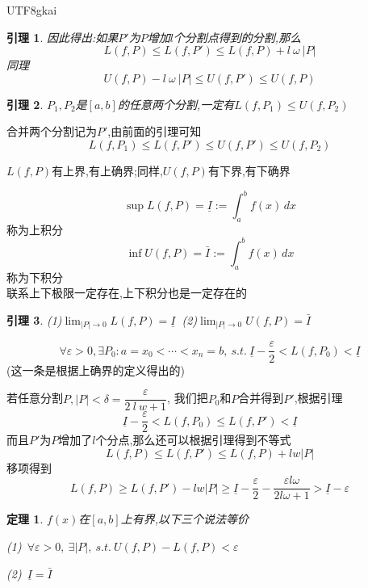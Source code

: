 \documentclass{article}
\newtheorem{theorem}{定理}[subsection]
\newtheorem{lemma}{引理}[subsection]
\newenvironment{cproof}{%
\heiti{证明}\kaishu
}{%
}
\begin{document}
\begin{CJK}{UTF8}{gkai}
\begin{lemma}
  因此得出:如果$P'$为$P$增加$l$个分割点得到的分割,那么\[L(f,P) \leq L(f,P') \leq L(f,P) + l ~\omega~|P|\]
  同理\[U(f,P)  - l~ \omega~|P|\leq U(f,P') \leq U(f,P)\]
\end{lemma}

\begin{lemma}
  $P_1,P_2$是$[a,b]$的任意两个分割,一定有$L(f,P_1)\leq U(f,P_2)$\\
\end{lemma}

\begin{cproof}
  合并两个分割记为$P'$,由前面的引理可知
  \[L(f,P_1)\leq L(f,P') \leq U(f,P')\leq U(f,P_2)\]
\end{cproof}

$L(f,P)$有上界,有上确界;同样,$U(f,P)$有下界,有下确界

\[\sup L(f,P) = \underline{I} := \int_{a}^{b}f(x)\, dx\]称为上积分\\
\[\inf U(f,P) = \bar{I} := \int_{a}^{b}f(x)\, dx\]称为下积分\\
联系上下极限一定存在,上下积分也是一定存在的\\

\begin{lemma}
  (1)$\lim_{|P|\to 0}L(f,P) = \underline{I}~$
  (2)$\lim_{|P|\to 0}U(f,P) = \bar{I}$

\end{lemma}

\begin{cproof}
  \[\forall \varepsilon > 0 ,\exists P_0 : a = x_0 < \cdots < x_n = b, ~s.t.~ \underline{I} - \dfrac{\varepsilon}{2} < L(f 
  ,P_0) < \underline{I}\]
  (这一条是根据上确界的定义得出的)

若任意分割$P,|P| < \delta = \dfrac{\varepsilon}{2~l~w + 1}$,
我们把$P_0$和$P$合并得到$P'$,根据引理
\[\underline{I} - \dfrac{\varepsilon}{2} < L(f,P_0) \leq L(f,P')<  \underline{I}\]
而且$P'$为$P$增加了$l$个分点,那么还可以根据引理得到不等式
\[L(f,P) \leq L(f,P') \leq L(f,P) + lw|P|\]
移项得到\[L(f,P) \geq L(f,P') - l w |P| \geq \underline{I} - \dfrac{\varepsilon}{2} - \dfrac{\varepsilon l \omega}{2 l \omega + 1} > \underline{I} - \varepsilon\]
\end{cproof}

\begin{theorem}
  $f(x)$在$[a,b]$上有界,以下三个说法等价

  (1)~$\forall \varepsilon > 0,~\exists |P|,~s.t.~ U(f,P) - L(f,P) < \varepsilon$

  (2)~$\underline{I} = \bar{I}$


\end{theorem}
\end{CJK}
\end{document}
